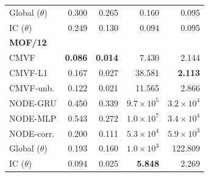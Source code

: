 \begin{tabular*}{\linewidth}{@{\extracolsep{\fill}}lrrrr}
Global ($\theta$) & 0.300 & 0.265 & 0.160 & 0.095 \\
IC ($\theta$) & 0.249 & 0.130 & 0.094 & 0.095 \\
\midrule
\multicolumn{5}{l}{\textbf{MOF/12}} \\
CMVF & \textbf{0.086} & \textbf{0.014} & 7.430 & 2.144 \\
CMVF-L1 & 0.167 & 0.027 & 38.581 & \textbf{2.113} \\
CMVF-unb. & 0.122 & 0.021 & 11.565 & 2.866 \\
NODE-GRU & 0.450 & 0.339 & $9.7\!\times\!10^{5}$ & $3.2\!\times\!10^{4}$ \\
NODE-MLP & 0.543 & 0.272 & $1.0\!\times\!10^{7}$ & $3.4\!\times\!10^{4}$ \\
NODE-corr. & 0.200 & 0.111 & $5.3\!\times\!10^{4}$ & $5.9\!\times\!10^{3}$ \\
Global ($\theta$) & 0.193 & 0.160 & $1.0\!\times\!10^{3}$ & 122.809 \\
IC ($\theta$) & 0.094 & 0.025 & \textbf{5.848} & 2.269 \\
\bottomrule
\end{tabular*}
